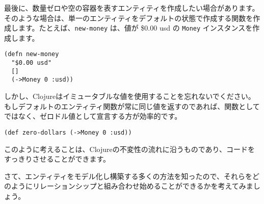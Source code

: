 最後に、数量ゼロや空の容器を表すエンティティを作成したい場合があります。そのような場合は、単一のエンティティをデフォルトの状態で作成する関数を作成します。たとえば、\texttt{new-money} は、値が \$0.00 usd の \texttt{Money} インスタンスを作成します。

\begin{lstlisting}[numbers=none]
(defn new-money
  "$0.00 usd"
  []
  (->Money 0 :usd))
\end{lstlisting}

しかし、Clojureはイミュータブルな値を使用することを忘れないでください。もしデフォルトのエンティティ関数が常に同じ値を返すのであれば、関数としてではなく、ゼロドル値として宣言する方が効率的です。


\begin{lstlisting}[numbers=none]
(def zero-dollars (->Money 0 :usd))
\end{lstlisting}

このように考えることは、Clojureの不変性の流れに沿うものであり、コードをすっきりさせることができます。
      
さて、エンティティをモデル化し構築する多くの方法を知ったので、それらをどのようにリレーションシップと組み合わせ始めることができるかを考えてみましょう。

